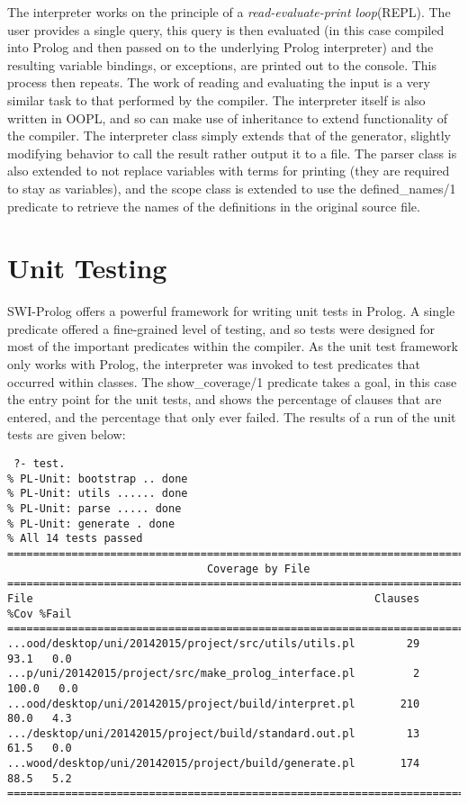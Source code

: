 \documentclass[12pt,a4paper,twoside,openright]{report}
\begin{document}
\bigskip

The interpreter works on the principle of a \emph{read-evaluate-print loop}(REPL). The user provides a single query, this query is then evaluated (in this case compiled into Prolog and then passed on to the underlying Prolog interpreter) and the resulting variable bindings, or exceptions, are printed out to the console. This process then repeats. The work of reading and evaluating the input is a very similar task to that performed by the compiler. The interpreter itself is also written in OOPL, and so can make use of inheritance to extend functionality of the compiler. The interpreter class simply extends that of the generator, slightly modifying behavior to call the result rather output it to a file. The parser class is also extended to not replace variables with terms for printing (they are required to stay as variables), and the scope class is extended to use the defined_names/1 predicate to retrieve the names of the definitions in the original source file.

\section{Unit Testing}

 SWI-Prolog offers a powerful framework for writing unit tests in Prolog. A single predicate offered a fine-grained level of testing, and so tests were designed for most of the important predicates within the compiler. As the unit test framework only works with Prolog, the interpreter was invoked to test predicates that occurred within classes. The show_coverage/1 predicate takes a goal, in this case the entry point for the unit tests, and shows the percentage of clauses that are entered, and the percentage that only ever failed. The results of a run of the unit tests are given below:
 
 \begin{verbatim}
 ?- test.
% PL-Unit: bootstrap .. done
% PL-Unit: utils ...... done
% PL-Unit: parse ..... done
% PL-Unit: generate . done
% All 14 tests passed
==============================================================================
                               Coverage by File                               
==============================================================================
File                                                     Clauses    %Cov %Fail
==============================================================================
...ood/desktop/uni/20142015/project/src/utils/utils.pl        29    93.1   0.0
...p/uni/20142015/project/src/make_prolog_interface.pl         2   100.0   0.0
...ood/desktop/uni/20142015/project/build/interpret.pl       210    80.0   4.3
.../desktop/uni/20142015/project/build/standard.out.pl        13    61.5   0.0
...wood/desktop/uni/20142015/project/build/generate.pl       174    88.5   5.2
==============================================================================
 \end{verbatim}
\end{document}
